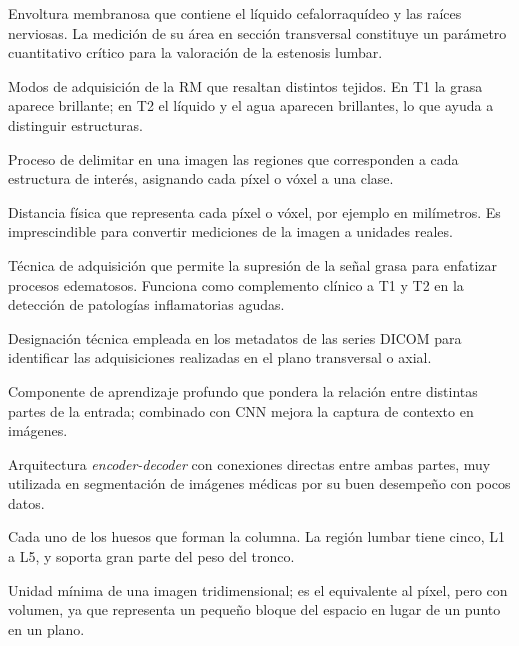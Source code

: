 \begin{description}[leftmargin=3.8cm, style=nextline]
    \item[Saco tecal (saco dural)] Envoltura membranosa que contiene el líquido cefalorraquídeo y las raíces nerviosas. La medición de su área en sección transversal constituye un parámetro cuantitativo crítico para la valoración de la estenosis lumbar.
    \item[Secuencias T1 y T2] Modos de adquisición de la RM que resaltan distintos tejidos. En T1 la grasa aparece brillante; en T2 el líquido y el agua aparecen brillantes, lo que ayuda a distinguir estructuras.
    \item[Segmentación] Proceso de delimitar en una imagen las regiones que corresponden a cada estructura de interés, asignando cada píxel o vóxel a una clase.
    \item[Spacing, espaciado] Distancia física que representa cada píxel o vóxel, por ejemplo en milímetros. Es imprescindible para convertir mediciones de la imagen a unidades reales.
    \item[STIR (Short Tau Inversion Recovery)] Técnica de adquisición que permite la supresión de la señal grasa para enfatizar procesos edematosos. Funciona como complemento clínico a T1 y T2 en la detección de patologías inflamatorias agudas.
    \item[TRA (transverse)] Designación técnica empleada en los metadatos de las series DICOM para identificar las adquisiciones realizadas en el plano transversal o axial.
    \item[Transformer / mecanismo de atención] Componente de aprendizaje profundo que pondera la relación entre distintas partes de la entrada; combinado con CNN mejora la captura de contexto en imágenes.
    \item[U-Net] Arquitectura \textit{encoder-decoder} con conexiones directas entre ambas partes, muy utilizada en segmentación de imágenes médicas por su buen desempeño con pocos datos.
    \item[Vértebra] Cada uno de los huesos que forman la columna. La región lumbar tiene cinco, L1 a L5, y soporta gran parte del peso del tronco.
    \item[Vóxel] Unidad mínima de una imagen tridimensional; es el equivalente al píxel, pero con volumen, ya que representa un pequeño bloque del espacio en lugar de un punto en un plano.
\end{description}
